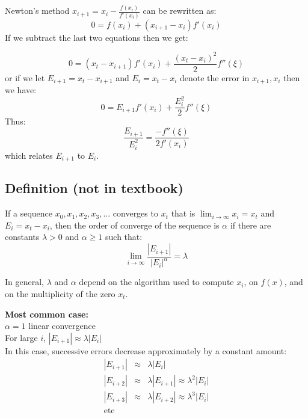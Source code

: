 \documentclass [titlepage,12pt,letter] {article}
\begin{document}
Newton's method $x_{i+1} = x_{i} - \frac{f(x_i)}{f'(x_i)}$ can be rewritten as: 
\begin{equation} 
0 = f(x_i) + (x_{i+1} -x_{i}) f'(x_{i})
\end{equation} 
\noindent 
If we subtract the last two equations then we get: 

\begin{equation} 
0 = (x_t -x_{i+1}) f'(x_i) + \frac{(x_t - x_i)^2}{2}f''(\xi)
\end{equation} 
\noindent or if we let $E_{i+1} = x_t - x_{i+1}$ and $E_i = x_t - x_{i}$ denote the error in $x_{i+1}, x_i$ then we have: 
\begin{equation} 
0 = E_{i+1} f'(x_i) + \frac{E_i^2}{2} f''(\xi) 
\end{equation} 
\noindent 
Thus: 
\begin{equation} 
\frac{E_{i+1}}{E_i^2} = \frac{-f''(\xi)}{2f'(x_{i})} 
\end{equation} 
\noindent 
which relates $E_{i+1}$ to $E_i$. 
\noindent 
\\
\subsection{Definition (not in textbook)}  
If a sequence ${x_0, x_1, x_2, x_3, \dots }$ converges to $x_t$ that is 
$\lim_{i \rightarrow \infty}x_i = x_t$ and $E_i = x_t - x_i$, then the order of converge of the sequence is $\alpha$ if there are constants $\lambda > 0$ and $\alpha \geq 1$ such that: 
\begin{equation} 
\lim_{i \rightarrow \infty} \frac{|E_{i+1}|}{|E_i|^{\alpha}} = \lambda 
\end{equation} 

In general, $\lambda$ and $\alpha$ depend on the algorithm used to compute ${x_i}$, on $f(x)$, and on the multiplicity of the zero $x_t$. 

{\bf Most common case:} 
\\ 
$\alpha = 1$ linear convergence \\ 
For large $i$, $|E_{i+1}| \approx \lambda |E_i|$ \\ 


In this case, successive errors decrease approximately by a constant amount: 
\begin{eqnarray*} 
|E_{i+1}| &\approx & \lambda |E_i| \\ 
|E_{i+2}| &\approx &  \lambda |E_{i+1}| \approx \lambda^2 |E_i|\\ 
|E_{i+3}| & \approx &  \lambda |E_{i+2}| \approx \lambda^3 |E_i|\\ 
\mbox{etc} \\ 
\end{eqnarray*} 
\end{document}
